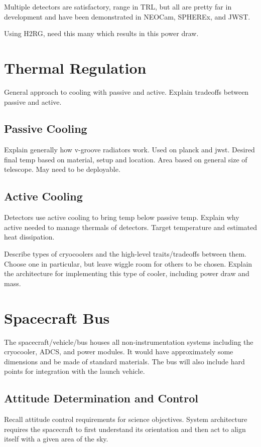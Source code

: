 \documentclass{ws-jai}
\begin{document}
Multiple detectors are satisfactory, range in TRL, but all are pretty far in development and have been demonstrated in NEOCam, SPHEREx, and JWST\@.

Using H2RG, need this many which results in this power draw.

\section{Thermal Regulation}
\label{S:tempregulation}
General approach to cooling with passive and active. Explain tradeoffs between passive and active.

\subsection{Passive Cooling}
\label{sS:vgrooves}
Explain generally how v-groove radiators work. Used on planck and jwst. Desired final temp based on material, setup and location. Area based on general size of telescope. May need to be deployable.

\subsection{Active Cooling}
\label{sS:cryocooler}
Detectors use active cooling to bring temp below passive temp. Explain why active needed to manage thermals of detectors. Target temperature and estimated heat dissipation.

Describe types of cryocoolers and the high-level traits/tradeoffs between them. Choose one in particular, but leave wiggle room for others to be chosen. Explain the architecture for implementing this type of cooler, including power draw and mass.

\section{Spacecraft Bus}
\label{S:bus}
The spacecraft/vehicle/bus houses all non-instrumentation systems including the cryocooler, ADCS, and power modules. It would have approximately some dimensions and be made of standard materials. The bus will also include hard points for integration with the launch vehicle.

\subsection{Attitude Determination and Control}
\label{sS:adcs}
Recall attitude control requirements for science objectives. System architecture requires the spacecraft to first understand its orientation and then act to align itself with a given area of the sky.
\end{document}

